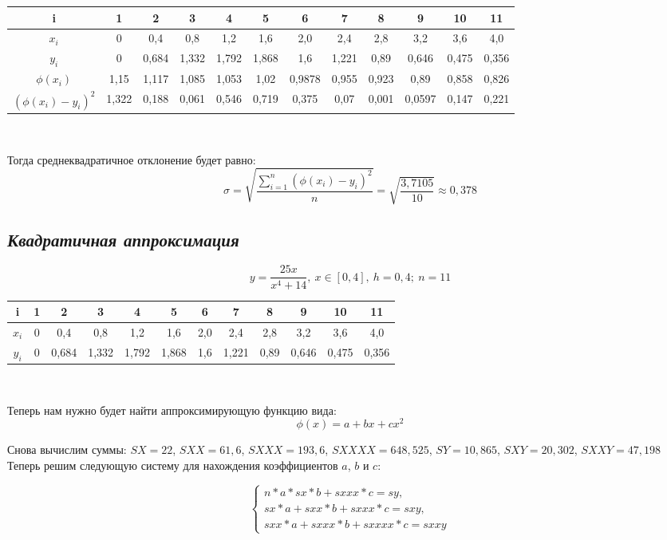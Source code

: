 \documentclass[12pt]{article}
\begin{document}
\centering
\begin{tabular}{ |c|c|c|c|c|c|c|c|c|c|c|c| }
  \hline
  i & 1 & 2 & 3 & 4 & 5 & 6 & 7 & 8 & 9 & 10 & 11\\
  \hline
  $x_i$ & 0 & 0,4 & 0,8 & 1,2 & 1,6 & 2,0 & 2,4 & 2,8 & 3,2 & 3,6 & 4,0 \\
  \hline
  $y_i$ & 0 & 0,684 & 1,332 & 1,792 & 1,868 & 1,6 & 1,221 & 0,89 & 0,646 & 0,475 & 0,356 \\
  \hline
  $\phi(x_i)$ & 1,15 & 1,117 & 1,085 & 1,053 & 1,02 & 0,9878 & 0,955 & 0,923 & 0,89 & 0,858 & 0,826 \\
  \hline
  $(\phi(x_i) - y_i)^2$ & 1,322 & 0,188 & 0,061 & 0,546 & 0,719 & 0,375 & 0,07 & 0,001 & 0,0597 & 0,147 & 0,221 \\
  \hline
\end{tabular}\\
\raggedright
\vspace{5mm}
Тогда среднеквадратичное отклонение будет равно:
$$ \sigma = \sqrt{\frac{\sum_{i=1}^n (\phi(x_i) - y_i)^2}{n}} = \sqrt{\frac{3,7105}{10}} \approx 0,378 $$

\subsection*{\textit{Квадратичная аппроксимация}}
\[ y = \frac{25x}{x^4 + 14},\ x \in [0,4],\ h = 0,4;\ n = 11 \]

\centering
\begin{tabular}{ |c|c|c|c|c|c|c|c|c|c|c|c| }
  \hline
  i & 1 & 2 & 3 & 4 & 5 & 6 & 7 & 8 & 9 & 10 & 11\\
  \hline
  $x_i$ & 0 & 0,4 & 0,8 & 1,2 & 1,6 & 2,0 & 2,4 & 2,8 & 3,2 & 3,6 & 4,0 \\
  \hline
  $y_i$ & 0 & 0,684 & 1,332 & 1,792 & 1,868 & 1,6 & 1,221 & 0,89 & 0,646 & 0,475 & 0,356 \\
  \hline
\end{tabular}\\
\raggedright
\vspace{5mm}
Теперь нам нужно будет найти аппроксимирующую функцию вида:
\[ \phi(x) = a + bx + cx^2 \]

Снова вычислим суммы: $SX = 22$, $SXX = 61,6$, $SXXX = 193,6$, $SXXXX = 648,525$, $SY = 10,865$, $SXY = 20,302$, $SXXY = 47,198$\\

Теперь решим следующую систему для нахождения коэффициентов $a$, $b$ и $c$:

\begin{equation}
  \begin{cases}
    n * a * sx * b + sxxx * c = sy,\\
    sx * a + sxx * b + sxxx * c = sxy,\\
    sxx * a + sxxx * b + sxxxx * c = sxxy
  \end{cases}
\end{equation}
\end{document}
